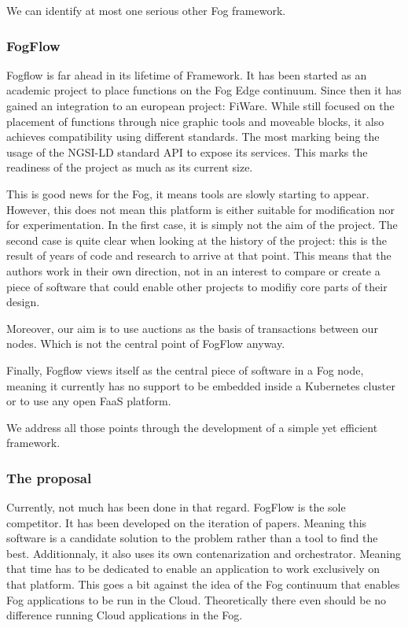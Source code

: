 \documentclass[11pt]{sdm}
\begin{document}
We can identify at most one serious other Fog framework.

\subsubsection{FogFlow}

Fogflow is far ahead in its lifetime of Framework. It has been started as an academic project to place functions on the Fog Edge continuum. Since then it has gained an integration to an european project: FiWare. While still focused on the placement of functions through nice graphic tools and moveable blocks, it also achieves compatibility using different standards. The most marking being the usage of the NGSI-LD standard API to expose its services. This marks the readiness of the project as much as its current size.

This is good news for the Fog, it means tools are slowly starting to appear. However, this does not mean this platform is either suitable for modification nor for experimentation. In the first case, it is simply not the aim of the project. The second case is quite clear when looking at the history of the project: this is the result of years of code and research to arrive at that point. This means that the authors work in their own direction, not in an interest to compare or create a piece of software that could enable other projects to modifiy core parts of their design.

Moreover, our aim is to use auctions as the basis of transactions between our nodes. Which is not the central point of FogFlow anyway.

Finally, Fogflow views itself as the central piece of software in a Fog node, meaning it currently has no support to be embedded inside a Kubernetes cluster or to use any open \gls{FaaS} platform.

We address all those points through the development of a simple yet efficient framework.

\subsubsection{The proposal}

Currently, not much has been done in that regard. FogFlow is the sole competitor. It has been developed on the iteration of papers. Meaning this software is a candidate solution to the problem rather than a tool to find the best. Additionnaly, it also uses its own contenarization and orchestrator. Meaning that time has to be dedicated to enable an application to work exclusively on that platform. This goes a bit against the idea of the Fog continuum that enables Fog applications to be run in the Cloud. Theoretically there even should be no difference running Cloud applications in the Fog.
\end{document}

